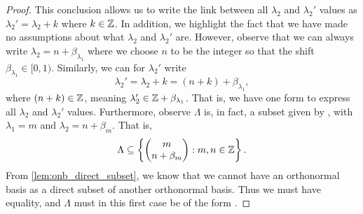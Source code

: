 \documentclass[../thesis.tex]{subfiles}
\begin{document}
\begin{proof}
    This conclusion allows us to write the link between all $\lambda_2$ and $\lambda_2'$ values as $\lambda_2' = \lambda_2 + k$ where $k\in \mathbb{Z}$. In addition, we highlight the fact that we have made no assumptions about what $\lambda_2$ and $\lambda_2'$ are. However, observe that we can always write $\lambda_2 = n+\beta_{\lambda_1}$ where we choose $n$ to be the integer so that the shift $\beta_{\lambda_1}\in [0,1)$. Similarly, we can for $\lambda_2'$ write
    \begin{equation*}
        \lambda_2' = \lambda_2 + k = (n+k) +  \beta_{\lambda_1},
    \end{equation*}
    where $(n+k)\in \mathbb{Z}$, meaning $\lambda_2' \in \mathbb{Z} + \beta_{\lambda_1}$. That is, we have one form to express all $\lambda_2$ and $\lambda_2'$ values. %
    Furthermore, observe $\Lambda$ is, in fact, a subset given by , with $\lambda_1 = m$ and $\lambda_2 = n+\beta_m$. That is,
    \begin{equation*}  %
        \Lambda \subseteq \braqMed{\begin{pmatrix} m \\ n+\beta_m\end{pmatrix} : m,n \in \Z}.
    \end{equation*} %
    From \cref{lem:onb_direct_subset}, we know that we cannot have an orthonormal basis as a direct subset of another orthonormal basis. Thus we must have equality, and $\Lambda$ must in this first case be of the form .


\end{proof}
\end{document}
